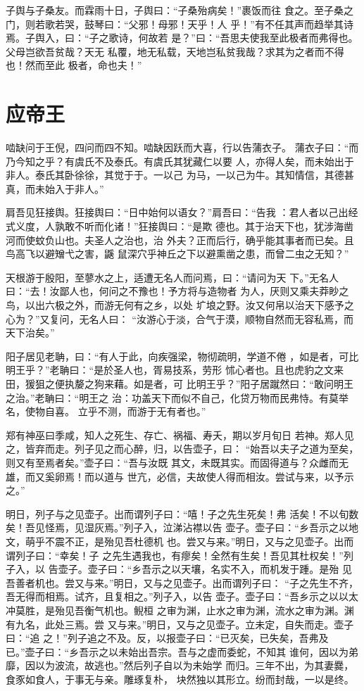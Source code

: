 \documentclass[12pt,UTF8]{ctexbook}
\begin{document}
子舆与子桑友。而霖雨十日，子舆曰：“子桑殆病矣！”裹饭而往 食之。至子桑之门，则若歌若哭，鼓琴曰：“父邪！母邪！天乎！人 乎！”有不任其声而趋举其诗焉。子舆入，曰：“子之歌诗，何故若 是？”曰：“吾思夫使我至此极者而弗得也。父母岂欲吾贫哉？天无 私覆，地无私载，天地岂私贫我哉？求其为之者而不得也！然而至此 极者，命也夫！”

\section{应帝王}

啮缺问于王倪，四问而四不知。啮缺因跃而大喜，行以告蒲衣子。 蒲衣子曰：“而乃今知之乎？有虞氏不及泰氏。有虞氏其犹藏仁以要 人，亦得人矣，而未始出于非人。泰氏其卧徐徐，其觉于于。一以己 为马，一以己为牛。其知情信，其德甚真，而未始入于非人。”

肩吾见狂接舆。狂接舆曰：“日中始何以语女？”肩吾曰：“告我 ：君人者以己出经式义度，人孰敢不听而化诸！”狂接舆曰：“是欺 德也。其于治天下也，犹涉海凿河而使蚊负山也。夫圣人之治也，治 外夫？正而后行，确乎能其事者而已矣。且鸟高飞以避矰弋之害，鼷 鼠深穴乎神丘之下以避熏凿之患，而曾二虫之无知？”

天根游于殷阳，至蓼水之上，适遭无名人而问焉，曰：“请问为天 下。”无名人曰：“去！汝鄙人也，何问之不豫也！予方将与造物者 为人，厌则又乘夫莽眇之鸟，以出六极之外，而游无何有之乡，以处 圹埌之野。汝又何帛以治天下感予之心为？”又复问，无名人曰： “汝游心于淡，合气于漠，顺物自然而无容私焉，而天下治矣。”

阳子居见老聃，曰：“有人于此，向疾强梁，物彻疏明，学道不倦 ，如是者，可比明王乎？”老聃曰：“是於圣人也，胥易技系，劳形 怵心者也。且也虎豹之文来田，猨狙之便执嫠之狗来藉。如是者，可 比明王乎？”阳子居蹴然曰：“敢问明王之治。”老聃曰：“明王之 治：功盖天下而似不自己，化贷万物而民弗恃。有莫举名，使物自喜。 立乎不测，而游于无有者也。”

郑有神巫曰季咸，知人之死生、存亡、祸福、寿夭，期以岁月旬日 若神。郑人见之，皆弃而走。列子见之而心醉，归，以告壶子，曰： “始吾以夫子之道为至矣，则又有至焉者矣。”壶子曰：“吾与汝既 其文，未既其实。而固得道与？众雌而无雄，而又奚卵焉！而以道与 世亢，必信，夫故使人得而相汝。尝试与来，以予示之。”

明日，列子与之见壶子。出而谓列子曰：“嘻！子之先生死矣！弗 活矣！不以旬数矣！吾见怪焉，见湿灰焉。”列子入，泣涕沾襟以告 壶子。壶子曰：“乡吾示之以地文，萌乎不震不正，是殆见吾杜德机 也。尝又与来。”明日，又与之见壶子。出而谓列子曰：“幸矣！子 之先生遇我也，有瘳矣！全然有生矣！吾见其杜权矣！”列子入，以 告壶子。壶子曰：“乡吾示之以天壤，名实不入，而机发于踵。是殆 见吾善者机也。尝又与来。”明日，又与之见壶子。出而谓列子曰： “子之先生不齐，吾无得而相焉。试齐，且复相之。”列子入，以告 壶子。壶子曰：“吾乡示之以以太冲莫胜，是殆见吾衡气机也。鲵桓 之审为渊，止水之审为渊，流水之审为渊。渊有九名，此处三焉。尝 又与来。”明日，又与之见壶子。立未定，自失而走。壶子曰：“追 之！”列子追之不及。反，以报壶子曰：“已灭矣，已失矣，吾弗及 已。”壶子曰：“乡吾示之以未始出吾宗。吾与之虚而委蛇，不知其 谁何，因以为弟靡，因以为波流，故逃也。”然后列子自以为未始学 而归。三年不出，为其妻爨，食豕如食人，于事无与亲。雕琢复朴， 块然独以其形立。纷而封哉，一以是终。
\end{document}

